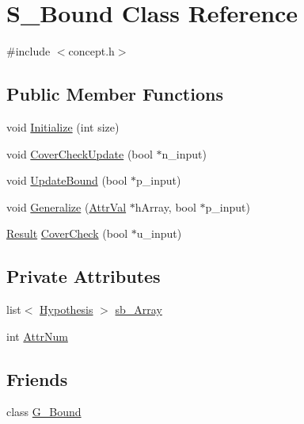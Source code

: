 \hypertarget{class_s___bound}{\section{S\-\_\-\-Bound Class Reference}
\label{class_s___bound}
}


{\ttfamily \#include $<$concept.\-h$>$}

\subsection*{Public Member Functions}
\begin{DoxyCompactItemize}
\item 
void \hyperlink{class_s___bound_abeb4548d8a255438173bda64849b0a4d}{Initialize} (int size)
\item 
void \hyperlink{class_s___bound_aee5a88ab73dd09ac42953b6f3545dfe2}{Cover\-Check\-Update} (bool $\ast$n\-\_\-input)
\item 
void \hyperlink{class_s___bound_a1391ba6c3f3fab3fd5fa57ecf8e1e66a}{Update\-Bound} (bool $\ast$p\-\_\-input)
\item 
void \hyperlink{class_s___bound_ae266bf5fa4d70959ce3b33ebe2d13dfa}{Generalize} (\hyperlink{concept_8h_a9680d29b8d997e4adbf99481b65e897d}{Attr\-Val} $\ast$h\-Array, bool $\ast$p\-\_\-input)
\item 
\hyperlink{concept_8h_a28287671eaf7406afd604bd055ba4066}{Result} \hyperlink{class_s___bound_ad42d2df371d817894fd44faff0eadd2f}{Cover\-Check} (bool $\ast$u\-\_\-input)
\end{DoxyCompactItemize}
\subsection*{Private Attributes}
\begin{DoxyCompactItemize}
\item 
list$<$ \hyperlink{class_hypothesis}{Hypothesis} $>$ \hyperlink{class_s___bound_a06e45530f4b7a999dfaa17ca73ef1d4f}{sb\-\_\-\-Array}
\item 
int \hyperlink{class_s___bound_a04cdddc7f5a38bb02bc8a706c275298f}{Attr\-Num}
\end{DoxyCompactItemize}
\subsection*{Friends}
\begin{DoxyCompactItemize}
\item 
class \hyperlink{class_s___bound_ada6e422609483cdffa32ad88125d9f0d}{G\-\_\-\-Bound}
\end{DoxyCompactItemize}


